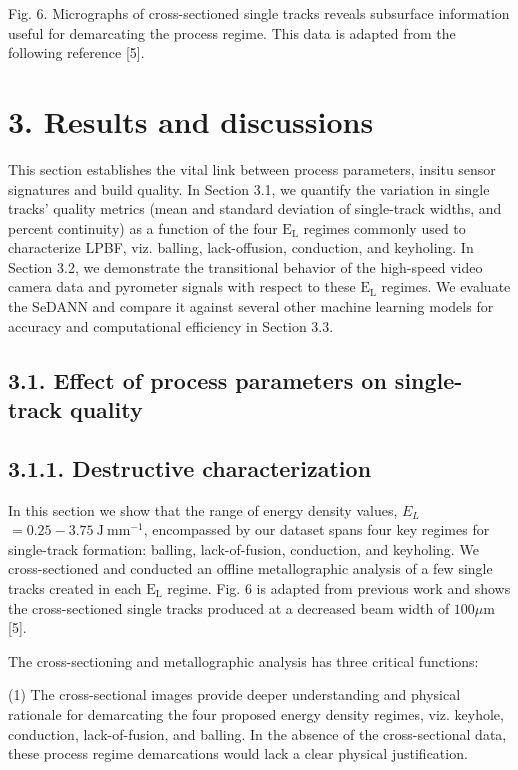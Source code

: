 \documentclass[10pt]{article}
\begin{document}
Fig. 6. Micrographs of cross-sectioned single tracks reveals subsurface information useful for demarcating the process regime. This data is adapted from the following reference [5].

\section*{3. Results and discussions}
This section establishes the vital link between process parameters, insitu sensor signatures and build quality. In Section 3.1, we quantify the variation in single tracks' quality metrics (mean and standard deviation of single-track widths, and percent continuity) as a function of the four $\mathrm{E}_{\mathrm{L}}$ regimes commonly used to characterize LPBF, viz. balling, lack-offusion, conduction, and keyholing. In Section 3.2, we demonstrate the transitional behavior of the high-speed video camera data and pyrometer signals with respect to these $\mathrm{E}_{\mathrm{L}}$ regimes. We evaluate the SeDANN and compare it against several other machine learning models for accuracy and computational efficiency in Section 3.3.

\subsection*{3.1. Effect of process parameters on single-track quality}
\subsection*{3.1.1. Destructive characterization}
In this section we show that the range of energy density values, $E_{L}$ $=0.25-3.75 \mathrm{~J} \mathrm{~mm}^{-1}$, encompassed by our dataset spans four key regimes for single-track formation: balling, lack-of-fusion, conduction, and keyholing. We cross-sectioned and conducted an offline metallographic analysis of a few single tracks created in each $\mathrm{E}_{\mathrm{L}}$ regime. Fig. 6 is adapted from previous work and shows the cross-sectioned single tracks produced at a decreased beam width of $100 \mu \mathrm{m}$ [5].

The cross-sectioning and metallographic analysis has three critical functions:

(1) The cross-sectional images provide deeper understanding and physical rationale for demarcating the four proposed energy density regimes, viz. keyhole, conduction, lack-of-fusion, and balling. In the absence of the cross-sectional data, these process regime demarcations would lack a clear physical justification.
\end{document}
